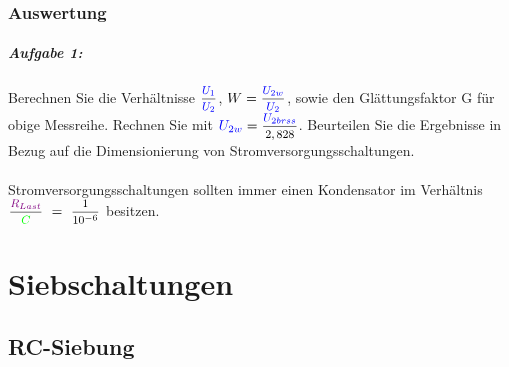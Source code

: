\documentclass[11pt,a4paper,titlepage]{scrreprt}
\newcommand{\spannung}[1]{\textcolor{blue}{#1}}
\newcommand{\widerstand}[1]{\textcolor{violet}{#1}}
\newcommand{\capacity}[1]{\textcolor{green}{#1}}
\begin{document}
			\subsection{Auswertung}
			\paragraph{Aufgabe 1:}  Berechnen Sie die Verhältnisse $\mfrac{\spannung{U_1}}{\spannung{U_2}}$, $W =\mfrac{\spannung{U_{2w}}}{\spannung{U_2}}$, sowie den Glättungsfaktor G für obige Messreihe. Rechnen Sie mit $\spannung{U_{2w}} = \mfrac{\spannung{U_{2brss}}}{2,828}$. Beurteilen Sie die Ergebnisse in Bezug auf die Dimensionierung von Stromversorgungsschaltungen.\\
            \\
            Stromversorgungsschaltungen sollten immer einen Kondensator im Verhältnis $\mfrac{\widerstand{R_{Last}}}{\capacity{C}}~=~\mfrac{1}{10^{-6}}$ besitzen.
            
            
	\chapter{Siebschaltungen}
    	\section{RC-Siebung}
\end{document}
